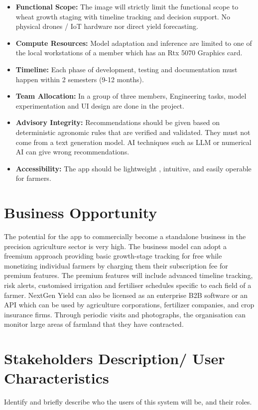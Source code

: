 \documentclass{FastFyp}
\begin{document}
\begin{itemize}
    \item \textbf{Functional Scope:} The image will strictly limit the functional scope to wheat growth staging with timeline tracking and decision support. No physical drones / IoT hardware nor direct yield forecasting.
    \item \textbf{Compute Resources:} Model adaptation and inference are limited to one of the local workstations of a member which has an Rtx 5070 Graphics card.
    \item \textbf{Timeline: }Each phase of development, testing and documentation must happen within 2 semesters (9-12 months). 
    \item \textbf{Team Allocation:} In a group of three members, Engineering tasks, model experimentation and UI design are done in the project.
    \item \textbf{Advisory Integrity: }Recommendations should be given based on deterministic agronomic rules that are verified and validated. They must not come from a text generation model. AI techniques such as LLM or numerical AI can give wrong recommendations.
    \item \textbf{Accessibility: }The app should be lightweight , intuitive, and easily operable for farmers.
\end{itemize}

 
\section{Business Opportunity}
The potential for the app to commercially become a standalone business in the precision agriculture sector is very high. The business model can adopt a freemium approach providing basic growth-stage tracking for free while monetizing individual farmers by charging them their subscription fee for premium features. The premium features will include advanced timeline tracking, risk alerts, customised irrigation and fertiliser schedules specific to each field of a farmer.
NextGen Yield can also be licensed as an enterprise B2B software or an API which can be used by agriculture corporations, fertilizer companies, and crop insurance firms. Through periodic visits and photographs, the organisation can monitor large areas of farmland that they have contracted. 

 
\section{Stakeholders Description/ User Characteristics}
Identify and briefly describe who the users of this system will be, and their roles.
\end{document}

